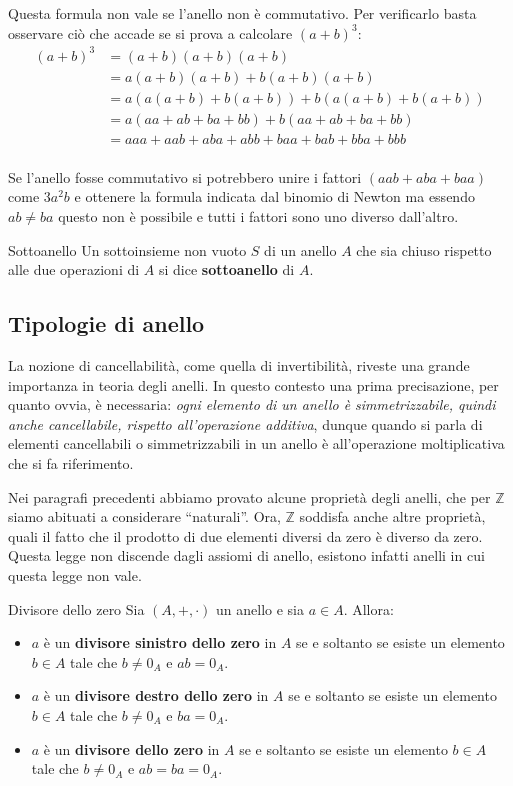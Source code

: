 Questa formula non vale se l'anello non è commutativo. Per verificarlo basta osservare ciò che accade se si prova a calcolare $(a+b)^{3}$:
\begin{align*}
	(a+b)^{3} &= (a+b)(a+b)(a+b) \\
	&= a(a+b)(a+b) + b(a+b)(a+b) 	\\
	&= a(a(a+b) +b(a+b)) + b(a(a+b)+b(a+b))\\
	&= a(aa+ab +ba+bb) + b(aa+ab+ba+bb) \\
	&= aaa+aab+aba+abb + baa +bab + bba + bbb \\
\end{align*}

Se l'anello fosse commutativo si potrebbero unire i fattori $(aab+aba+baa)$ come $3a^{2}b$ e ottenere la formula indicata dal binomio di Newton ma essendo $ab \neq ba$ questo non è possibile e tutti i fattori sono uno diverso dall'altro.

\begin{defbox}{Sottoanello}
	Un sottoinsieme non vuoto $S$ di un anello $A$ che sia chiuso rispetto alle due operazioni di $A$ si dice \textbf{sottoanello} di $A$.
\end{defbox}

\subsection{Tipologie di anello}
La nozione di cancellabilità, come quella di invertibilità, riveste una grande importanza in teoria degli anelli. In questo contesto una prima precisazione, per quanto ovvia, è necessaria: \textit{ogni elemento di un anello è simmetrizzabile, quindi anche cancellabile, rispetto all'operazione additiva}, dunque quando si parla di elementi cancellabili o simmetrizzabili in un anello è all’operazione moltiplicativa che si fa riferimento. 

Nei paragrafi precedenti abbiamo provato alcune proprietà degli anelli, che per $\mathbb{Z}$ siamo abituati a considerare ``naturali''. Ora, $\mathbb{Z}$ soddisfa anche altre proprietà, quali il fatto che il prodotto di due elementi diversi da zero è diverso da zero. Questa legge non discende dagli assiomi di anello, esistono infatti anelli in cui questa legge non vale.

\begin{defbox}{Divisore dello zero}
	Sia $(A,+,\cdot)$ un anello e sia $a \in A$. Allora:
	\begin{itemize}
		\item $a$ è un \textbf{divisore sinistro dello zero} in $A$ se e soltanto se esiste un elemento $b \in A$ tale che $b \neq 0_{A}$ e $ab=0_{A}$.
		\item $a$ è un \textbf{divisore destro dello zero} in $A$ se e soltanto se esiste un elemento $b \in A$ tale che $b \neq 0_{A}$ e $ba=0_{A}$.
		\item $a$ è un \textbf{divisore dello zero} in $A$ se e soltanto se esiste un elemento $b \in A$ tale che $b \neq 0_{A}$ e $ab=ba=0_{A}$.
	\end{itemize}
\end{defbox}

